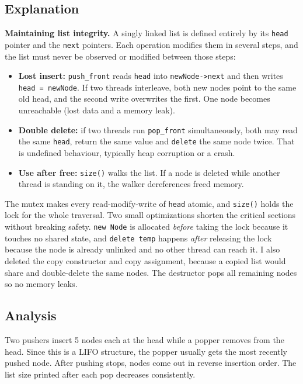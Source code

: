\documentclass[11pt]{article}
\begin{document}
\subsection*{Explanation}
\textbf{Maintaining list integrity.} A singly linked list is defined entirely
by its \texttt{head} pointer and the \texttt{next} pointers. Each operation
modifies them in several steps, and the list must never be observed or modified
between those steps:
\begin{itemize}
  \item \textbf{Lost insert:} \texttt{push\_front} reads \texttt{head} into
        \texttt{newNode->next} and then writes \texttt{head = newNode}. If two
        threads interleave, both new nodes point to the same old head, and the
        second write overwrites the first. One node becomes unreachable
        (lost data and a memory leak).
  \item \textbf{Double delete:} if two threads run \texttt{pop\_front}
        simultaneously, both may read the same \texttt{head}, return the same
        value and \texttt{delete} the same node twice. That is undefined
        behaviour, typically heap corruption or a crash.
  \item \textbf{Use after free:} \texttt{size()} walks the list. If a node is
        deleted while another thread is standing on it, the walker dereferences
        freed memory.
\end{itemize}
The mutex makes every read-modify-write of \texttt{head} atomic, and
\texttt{size()} holds the lock for the whole traversal. Two small optimizations
shorten the critical sections without breaking safety. \texttt{new Node} is
allocated \emph{before} taking the lock because it touches no shared state, and
\texttt{delete temp} happens \emph{after} releasing the lock because the node
is already unlinked and no other thread can reach it. I also deleted the copy
constructor and copy assignment, because a copied list would share and
double-delete the same nodes. The destructor pops all remaining nodes so no
memory leaks.

\subsection*{Analysis}
Two pushers insert 5 nodes each at the head while a popper removes from the
head. Since this is a LIFO structure, the popper usually gets the most recently
pushed node. After pushing stops, nodes come out in reverse insertion order.
The list size printed after each pop decreases consistently.
\end{document}
